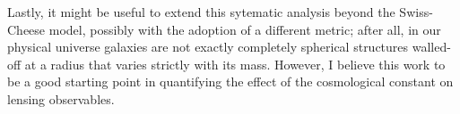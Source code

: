 Lastly, it might be useful to extend this sytematic analysis beyond the Swiss-Cheese model, possibly with the adoption of a different metric; after all, in our physical universe galaxies are not exactly completely spherical structures walled-off at a radius that varies strictly with its mass. However, I believe this work to be a good starting point in quantifying the effect of the cosmological constant on lensing observables. 

